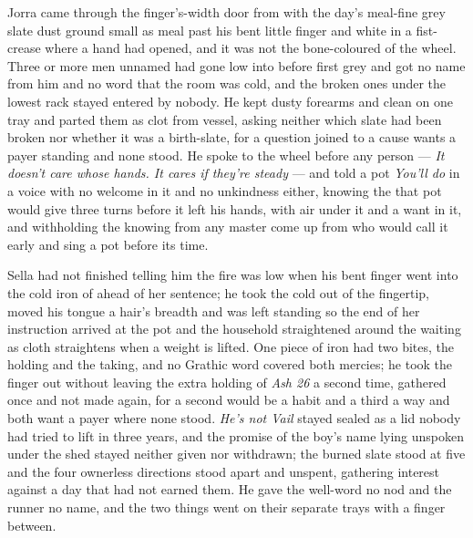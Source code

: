 Jorra came through the finger's-width door from  with the day's meal-fine grey slate dust ground small as meal past his bent little finger and white in a fist-crease where a hand had opened, and it was not the bone-coloured  of the wheel. Three or more men unnamed had gone low into  before first grey and got no name from him and no word that the room was cold, and the broken ones under the lowest rack stayed entered by nobody. He kept dusty forearms and clean on one tray and parted them as clot from vessel, asking neither which slate had been broken nor whether it was a birth-slate, for a question joined to a cause wants a payer standing and none stood. He spoke to the wheel before any person --- \emph{It doesn't care whose hands. It cares if they're steady} --- and told a pot \emph{You'll do} in a voice with no welcome in it and no unkindness either, knowing the  that pot would give three turns before it left his hands, with air under it and a want in it, and withholding the knowing from any master come up from  who would call it early and sing a pot before its time.

Sella had not finished telling him the fire was low when his bent finger went into the cold iron of  ahead of her sentence; he took the cold out of the fingertip, moved his tongue a hair's breadth and was left standing so the end of her instruction arrived at the pot and the household straightened around the waiting as cloth straightens when a weight is lifted. One piece of iron had two bites, the holding and the taking, and no Grathic word covered both mercies; he took the finger out without leaving the extra holding of \emph{Ash 26} a second time, gathered once and not made again, for a second would be a habit and a third a way and both want a payer where none stood. \emph{He's not Vail} stayed sealed as a lid nobody had tried to lift in three years, and the promise of the boy's name lying unspoken under the shed stayed neither given nor withdrawn; the burned slate stood at five and the four ownerless directions stood apart and unspent, gathering interest against a day that had not earned them. He gave the well-word no nod and the runner no name, and the two things went on their separate trays with a finger between.

